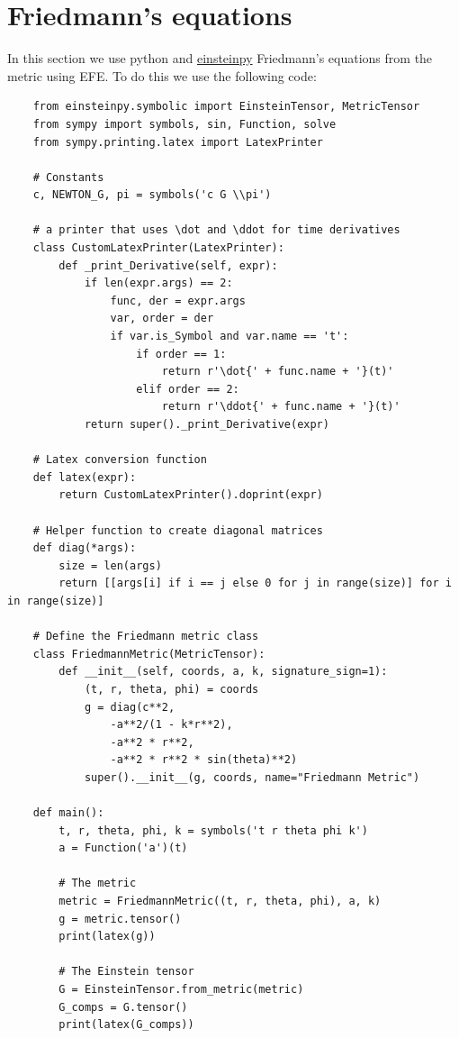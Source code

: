 \documentclass{article}
\begin{document}
\section{Friedmann's equations}
In this section we use python and \href{https://docs.einsteinpy.org/}{einsteinpy} Friedmann's equations from the metric using EFE. To do this we use the following code:
\begin{verbatim}
    from einsteinpy.symbolic import EinsteinTensor, MetricTensor
    from sympy import symbols, sin, Function, solve
    from sympy.printing.latex import LatexPrinter

    # Constants
    c, NEWTON_G, pi = symbols('c G \\pi')

    # a printer that uses \dot and \ddot for time derivatives
    class CustomLatexPrinter(LatexPrinter):
        def _print_Derivative(self, expr):
            if len(expr.args) == 2:
                func, der = expr.args
                var, order = der
                if var.is_Symbol and var.name == 't':
                    if order == 1:
                        return r'\dot{' + func.name + '}(t)'
                    elif order == 2:
                        return r'\ddot{' + func.name + '}(t)'
            return super()._print_Derivative(expr)

    # Latex conversion function
    def latex(expr):
        return CustomLatexPrinter().doprint(expr)

    # Helper function to create diagonal matrices
    def diag(*args):
        size = len(args)
        return [[args[i] if i == j else 0 for j in range(size)] for i in range(size)]

    # Define the Friedmann metric class
    class FriedmannMetric(MetricTensor):
        def __init__(self, coords, a, k, signature_sign=1):
            (t, r, theta, phi) = coords
            g = diag(c**2,
                -a**2/(1 - k*r**2),
                -a**2 * r**2,
                -a**2 * r**2 * sin(theta)**2)
            super().__init__(g, coords, name="Friedmann Metric")

    def main():
        t, r, theta, phi, k = symbols('t r theta phi k')
        a = Function('a')(t)
        
        # The metric
        metric = FriedmannMetric((t, r, theta, phi), a, k)
        g = metric.tensor()
        print(latex(g))
        
        # The Einstein tensor
        G = EinsteinTensor.from_metric(metric)
        G_comps = G.tensor()
        print(latex(G_comps))
        

\end{verbatim}
\end{document}
